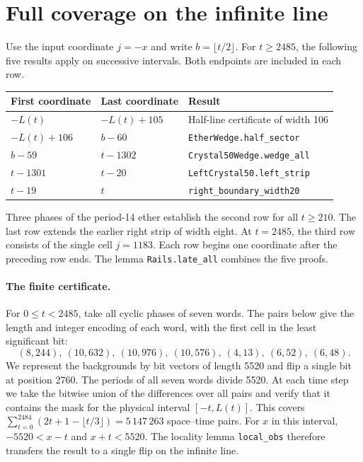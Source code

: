 \documentclass[11pt, a4paper]{article}
\begin{document}
\section{Full coverage on the infinite line}
Use the input coordinate $j=-x$ and write $b=\lfloor t/2\rfloor$. For $t\ge2485$, the following five results apply on successive intervals. Both endpoints are included in each row.
\begin{center}
\begin{tabular}{lll}
\toprule
First coordinate & Last coordinate & Result \\
\midrule
$-L(t)$ & $-L(t)+105$ & Half-line certificate of width 106 \\
$-L(t)+106$ & $b-60$ & \texttt{EtherWedge.half\_sector} \\
$b-59$ & $t-1302$ & \texttt{Crystal50Wedge.wedge\_all} \\
$t-1301$ & $t-20$ & \texttt{LeftCrystal50.left\_strip} \\
$t-19$ & $t$ & \texttt{right\_boundary\_width20} \\
\bottomrule
\end{tabular}
\end{center}
Three phases of the period-14 ether establish the second row for all $t\ge210$. The last row extends the earlier right strip of width eight. At $t=2485$, the third row consists of the single cell $j=1183$. Each row begins one coordinate after the preceding row ends. The lemma \texttt{Rails.late\_all} combines the five proofs.

\paragraph{The finite certificate.}
For $0\le t<2485$, take all cyclic phases of seven words. The pairs below give the length and integer encoding of each word, with the first cell in the least significant bit:
\[
(8,244),\ (10,632),\ (10,976),\ (10,576),\ (4,13),\ (6,52),\ (6,48).
\]
We represent the backgrounds by bit vectors of length 5520 and flip a single bit at position 2760. The periods of all seven words divide 5520. At each time step we take the bitwise union of the differences over all pairs and verify that it contains the mask for the physical interval $[-t,L(t)]$. This covers $\sum_{t=0}^{2484}(2t+1-\lfloor t/3\rfloor)=5\,147\,263$ space--time pairs. For $x$ in this interval, $-5520<x-t$ and $x+t<5520$. The locality lemma \texttt{local\_obs} therefore transfers the result to a single flip on the infinite line.
\end{document}
